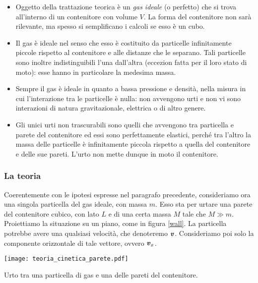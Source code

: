 \begin{itemize}
    \item Oggetto della trattazione teorica è un \textit{gas ideale}
    (o perfetto) che si trova all'interno di un contenitore con
    volume $V$. La forma del contenitore non sarà rilevante, ma spesso
    si semplificano i calcoli se esso è un cubo.

    \item Il gas è ideale nel senso che esso è costituito da particelle
    infinitamente piccole rispetto al contenitore e alle distanze che
    le separano. Tali particelle sono inoltre indistinguibili l'una
    dall'altra (eccezion fatta per il loro stato di moto): esse hanno
    in particolare la medesima massa.

    \item Sempre il gas è ideale in quanto a bassa pressione e densità,
    nella misura in cui l'interazione tra le particelle è nulla: non
    avvengono urti e non vi sono interazioni di natura gravitazionale,
    elettrica o di altro genere.

    \item Gli unici urti non trascurabili sono quelli che avvengono
    tra particella e parete del contenitore ed essi sono perfettamente
    elastici, perché tra l'altro la massa delle particelle è infinitamente
    piccola rispetto a quella del contenitore e delle sue pareti. L'urto
    non mette dunque in moto il contenitore.
\end{itemize}

\subsubsection*{La teoria}
Coerentemente con le ipotesi espresse nel paragrafo precedente,
consideriamo ora una singola particella del gas ideale, con massa
$m$. Esso sta per urtare una parete del contenitore cubico, con
lato $L$ e di una certa massa $M$ tale che $M \gg m$. Proiettiamo la situazione su un piano, come in figura
\ref{wall}. La particella potrebbe avere una qualsiasi velocità,
che denoteremo $\textbf{\textit{v}}$. Consideriamo poi solo la componente
orizzontale di tale vettore, ovvero $\textbf{\textit{v}}_x$.

\begin{marginfigure}
    \centering
    \texttt{[image: teoria\_cinetica\_parete.pdf]}
    \caption{Urto tra una particella di gas e una delle pareti
    del contenitore.}
    \label{wall}
\end{marginfigure}

